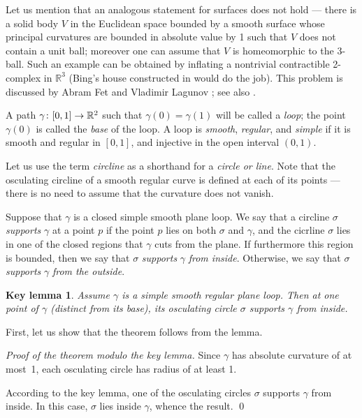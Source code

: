 \documentclass{article}
\newcommand*{\z}[1]{#1\nobreak\discretionary{}%
            {\hbox{$\mathsurround=0pt #1$}}{}}
\theoremstyle{theorem}
\newtheorem*{keylemma}{Key lemma}
\theoremstyle{definition}
\begin{document}
Let us mention that an analogous statement for surfaces does not hold --- there is a solid body $V$ in the Euclidean space bounded by a smooth surface whose principal curvatures are bounded in absolute value by 1 such that $V$ does not contain a unit ball; moreover one can assume that $V$ is homeomorphic to the 3-ball.
Such an example can be obtained by inflating a nontrivial contractible 2-complex in $\mathbb{R}^3$ 
(Bing's house constructed in \cite{bing} would do the job).
This problem is discussed by Abram Fet and Vladimir Lagunov \cite{lagunov-2,lagunov-fet}; see also \cite{petrunin-zamora}.

\medskip

A path $\gamma\colon [0,1]\z\to \mathbb{R}^2$ such that $\gamma (0) = \gamma (1)$ will be called a \emph{loop};
the point $\gamma (0)$ is called the \emph{base} of the loop.
A loop is \emph{smooth}, \emph{regular}, and \emph{simple} if it is smooth and regular in $[0,1]$, and injective in the open interval $(0,1)$.

Let us use the term \emph{circline} as a shorthand for a \emph{circle or line}.
Note that the osculating circline of a smooth regular curve is defined at each of its points --- there is no need to assume that the curvature does not vanish.

Suppose that $\gamma$ is a closed simple smooth plane loop.
We say that a circline $\sigma$ \emph{supports} $\gamma$ at a point $p$ if the point $p$ lies on both $\sigma$ and $\gamma$, and the cicrline $\sigma$ lies in one of the closed regions that $\gamma$ cuts from the plane.
If furthermore this region is bounded, then  we say that $\sigma$ \emph{supports} $\gamma$ \emph{from inside}.
Otherwise, we say that $\sigma$ \emph{supports} $\gamma$ \emph{from the outside}.

\begin{keylemma}\label{thm:moon}
Assume $\gamma$ is a simple smooth regular plane loop.
Then at one point of $\gamma$ (distinct from its base), its osculating circle $\sigma$ supports $\gamma$ from inside.
\end{keylemma}

First, let us show that the theorem follows from the lemma.

\medskip\noindent\textit{Proof of the theorem modulo the key lemma.}
Since $\gamma$ has absolute curvature of at most~1, each osculating circle has radius of at least 1.

According to the key lemma, one of the osculating circles $\sigma$ supports $\gamma$ from inside.
In this case, $\sigma$ lies inside $\gamma$, whence the result.
\qed
\end{document}
